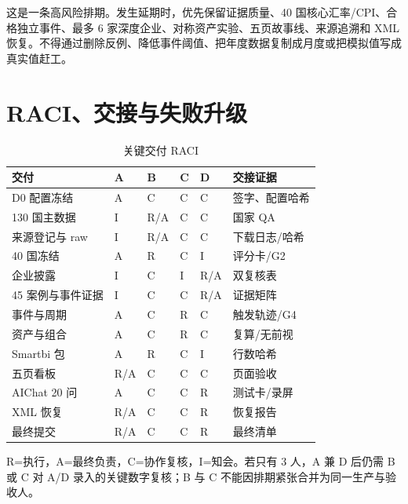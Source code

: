\documentclass[UTF8,fontset=windows,12pt,openany]{ctexbook}
\begin{document}
这是一条高风险排期。发生延期时，优先保留证据质量、40 国核心汇率/CPI、合格独立事件、最多 6 家深度企业、对称资产实验、五页故事线、来源追溯和 XML 恢复。不得通过删除反例、降低事件阈值、把年度数据复制成月度或把模拟值写成真实值赶工。

\chapter{RACI、交接与失败升级}

\begin{longtable}{p{4.0cm}p{1.5cm}p{1.5cm}p{1.5cm}p{1.5cm}p{3.1cm}}
\caption{关键交付 RACI}\label{tab:raci}\\
\toprule
\textbf{交付} & \textbf{A} & \textbf{B} & \textbf{C} & \textbf{D} & \textbf{交接证据}\\
\midrule
D0 配置冻结 & A & C & C & C & 签字、配置哈希\\
130 国主数据 & I & R/A & C & C & 国家 QA\\
来源登记与 raw & I & R/A & C & C & 下载日志/哈希\\
40 国冻结 & A & R & C & I & 评分卡/G2\\
企业披露 & I & C & I & R/A & 双复核表\\
45 案例与事件证据 & I & C & C & R/A & 证据矩阵\\
事件与周期 & A & C & R & C & 触发轨迹/G4\\
资产与组合 & A & C & R & C & 复算/无前视\\
Smartbi 包 & A & R & C & I & 行数哈希\\
五页看板 & R/A & C & C & C & 页面验收\\
AIChat 20 问 & A & C & C & R & 测试卡/录屏\\
XML 恢复 & R/A & C & C & R & 恢复报告\\
最终提交 & R/A & C & C & R & 最终清单\\
\bottomrule
\end{longtable}

R=执行，A=最终负责，C=协作复核，I=知会。若只有 3 人，A 兼 D 后仍需 B 或 C 对 A/D 录入的关键数字复核；B 与 C 不能因排期紧张合并为同一生产与验收人。
\end{document}
